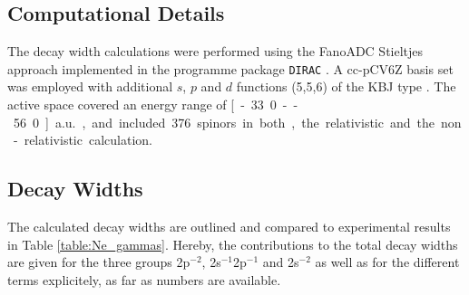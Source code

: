 \subsection{Computational Details}
The decay width calculations were performed using the FanoADC Stieltjes approach
implemented in the programme package \verb|DIRAC| \cite{DIRAC13}.
A cc-pCV6Z basis set was employed with
additional $s$, $p$ and $d$ functions (5,5,6) of the \ac{KBJ} type \cite{Kaufmann89}.
The active space covered an energy range of \unit[-33.0 -- 56.0]{a.u.}, and included
376 spinors in both, the relativistic and the non-relativistic calculation.

\subsection{Decay Widths}
The calculated decay widths are outlined and compared to experimental
results in Table \ref{table:Ne_gammas}. Hereby, the contributions to the
total decay widths are given
for the three groups 2p$^{-2}$, 2s$^{-1}$2p$^{-1}$ and 2s$^{-2}$ as well
as for the different terms explicitely, as far as numbers are available.


